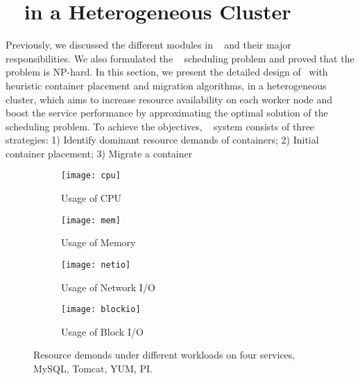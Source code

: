 \section{\sol~ in a Heterogeneous Cluster}
Previously, we discussed the different modules in \sol~ and their major responsibilities. We also formulated the \sol~ scheduling problem and proved that the problem is NP-hard.
In this section, we present the detailed design of \sol~with heuristic container placement and migration algorithms, in a heterogeneous cluster,
which aims to increase resource availability on each worker node and boost the service performance by  approximating the optimal solution of the \sol~ scheduling problem.
To achieve the objectives, \sol~ system consists of three strategies:
1) Identify dominant resource demands of containers;
2) Initial container placement;
3) Migrate a container



\begin{figure*}[ht]
   \centering
      \begin{subfigure}[t]{0.24\linewidth}
\centering
      \texttt{[image: cpu]}
      \vspace{-0.15in}
      \caption{Usage of CPU}
      \label{fig:cpu}
      \end{subfigure} %
      \begin{subfigure}[t]{0.24\linewidth}
\centering
      \texttt{[image: mem]}
      \vspace{-0.15in}
      \caption{Usage of Memory}
      \label{fig:mem}
      \end{subfigure} %
      \begin{subfigure}[t]{0.24\linewidth}
\centering
      \texttt{[image: netio]}
      \vspace{-0.15in}
      \caption{Usage of Network I/O}
      \label{fig:netio}
      \end{subfigure} %
      \begin{subfigure}[t]{0.24\linewidth}
\centering
      \texttt{[image: blockio]}
      \vspace{-0.15in}
      \caption{Usage of Block I/O}
      \label{fig:blockio}
      \end{subfigure} %
\caption{Resource demonds under different workloads on four services, MySQL, Tomcat, YUM, PI.}
\label{fig:understand}
\end{figure*}

